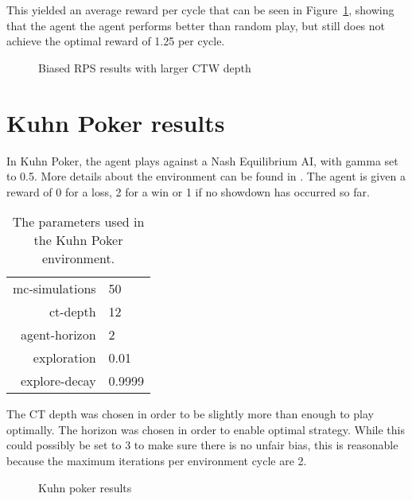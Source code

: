\documentclass[pdftex,twoside,a4paper]{report}
\begin{document}
This yielded an average reward per cycle that can be seen in
Figure~\ref{fig:rps_results_ctw}, showing that the agent the agent performs
better than random play, but still does not achieve the optimal reward of 1.25
per cycle.

\begin{figure}[h]
  \begin{center}
  \end{center}
  \caption{Biased RPS results with larger CTW depth}
  \label{fig:rps_results_ctw}
\end{figure}

\section{Kuhn Poker results}
In Kuhn Poker, the agent plays against a Nash Equilibrium AI, with gamma set to 0.5. More details about the environment can be found in \cite{kuhn}. The agent is given a reward of 0 for a loss, 2 for a win or 1 if no showdown has occurred so far.

\begin{table}[h]
\begin{center}
\begin{tabular}{| r | l | }
\hline
mc-simulations & 50\\
ct-depth & 12\\
agent-horizon & 2\\
exploration & 0.01\\
explore-decay & 0.9999\\
\hline
\end{tabular}
\caption{The parameters used in the Kuhn Poker environment.}
\end{center}
\end{table}

The CT depth was chosen in order to be slightly more than enough to play optimally. The horizon was chosen in order to enable optimal strategy. While this could possibly be set to 3 to make sure there is no unfair bias, this is reasonable because the maximum iterations per environment cycle are 2.

\begin{figure}[h]
  \begin{center}
  \end{center}
  \caption{Kuhn poker results}
  \label{fig:kuhn_results}
\end{figure}
\end{document}
